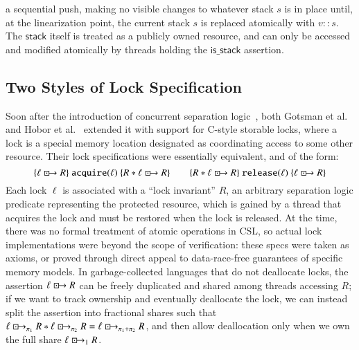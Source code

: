 \documentclass[runningheads]{llncs}
\newcommand{\islock}{\boxdotright}
\begin{document}
a sequential push, making no visible changes to whatever stack $s$ is in place until, at the linearization point, the current stack $s$ is replaced atomically with $v :: s$. The $\mathsf{stack}$ itself is treated as a publicly owned resource, and can only be accessed and modified atomically by threads holding the $\mathsf{is\_stack}$ assertion.

\subsection{Two Styles of Lock Specification}
Soon after the introduction of concurrent separation logic~\cite{csl}, both Gotsman et al.~\cite{gotsman} and Hobor et al.~\cite{oraclesematic} extended it with support for C-style storable locks, where a lock is a special memory location designated as coordinating access to some other resource. Their lock specifications were essentially equivalent, and of the form:
$$\{ \ell \islock R \}\ \texttt{acquire}(\ell)\ \{ R * \ell \islock R \} \qquad \{ R * \ell \islock R \}\ \texttt{release}(\ell)\ \{ \ell \islock R \}$$
Each lock $\ell$ is associated with a ``lock invariant'' $R$, an arbitrary separation logic predicate representing the protected resource, which is gained by a thread that acquires the lock and must be restored when the lock is released. At the time, there was no formal treatment of atomic operations in CSL, so actual lock implementations were beyond the scope of verification: these specs were taken as axioms, or proved through direct appeal to data-race-free guarantees of specific memory models. In garbage-collected languages that do not deallocate locks, the assertion $\ell \islock R$ can be freely duplicated and shared among threads accessing $R$; if we want to track ownership and eventually deallocate the lock, we can instead split the assertion into fractional shares such that $\ell \islock_{\pi_1} R * \ell \islock_{\pi_2} R = \ell \islock_{\pi_1 + \pi_2} R$, and then allow deallocation only when we own the full share $\ell \islock_1 R$.
\end{document}
